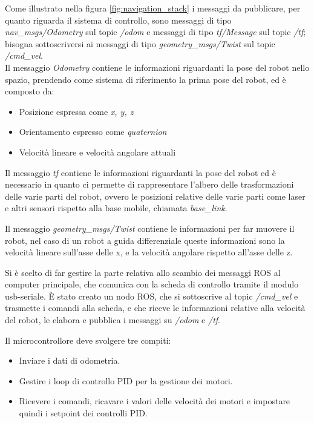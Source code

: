 \newpage
Come illustrato nella figura \ref{fig:navigation_stack} i messaggi da pubblicare, per quanto riguarda il sistema di controllo, sono messaggi di tipo \textit{nav\_msgs/Odometry} sul topic \textit{/odom} e messaggi di tipo \textit{tf/Message} sul topic \textit{/tf}; bisogna sottoscriversi ai messaggi di tipo \textit{geometry\_msgs/Twist} sul topic \textit{/cmd\_vel}. \\
Il messaggio \textit{Odometry} contiene le informazioni riguardanti la pose del robot nello spazio, prendendo come sistema di riferimento la prima pose del robot, ed è composto da:
\begin{itemize}
    \item Posizione espressa come \textit{x, y, z}
    \item Orientamento espresso come \textit{quaternion}
    \item Velocità lineare e velocità angolare attuali
\end{itemize}

Il messaggio \textit{tf} contiene le informazioni riguardanti la pose del robot ed è necessario in quanto ci permette di rappresentare l'albero delle trasformazioni delle varie parti del robot, ovvero le posizioni relative delle varie parti come laser e altri sensori rispetto alla base mobile, chiamata \textit{base\_link}.

Il messaggio \textit{geometry\_msgs/Twist} contiene le informazioni per far muovere il robot, nel caso di un robot a guida differenziale queste informazioni sono la velocità lineare sull'asse delle x, e la velocità angolare rispetto all'asse delle z.

Si è scelto di far gestire la parte relativa allo scambio dei messaggi ROS al computer principale, che comunica con la scheda di controllo tramite il modulo usb-seriale. 
È stato creato un nodo ROS, che si sottoscrive al topic \textit{/cmd\_vel} e trasmette i comandi alla scheda, e che riceve le informazioni relative alla velocità del robot, le elabora e pubblica i messaggi su \textit{/odom} e \textit{/tf}.

Il microcontrollore deve svolgere tre compiti: 
\begin{itemize}
    \item Inviare i dati di odometria.
    \item Gestire i loop di controllo PID per la gestione dei motori.
    \item Ricevere i comandi, ricavare i valori delle velocità dei motori e impostare quindi i setpoint dei controlli PID.
\end{itemize}

